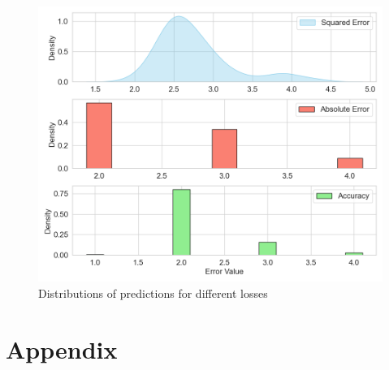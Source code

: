 \documentclass[9pt]{IEEEtran}
\begin{document}
\begin{figure}[h]
\centering
\includegraphics[width=0.9\columnwidth]{figures/distr.png}
\caption{Distributions of predictions for different losses}
\label{fig:distr}
\end{figure}



\newpage
\section{Appendix}
\begin{figure}[h]
\centering
{}
\label{fig:der}
\end{figure}




\end{document}
